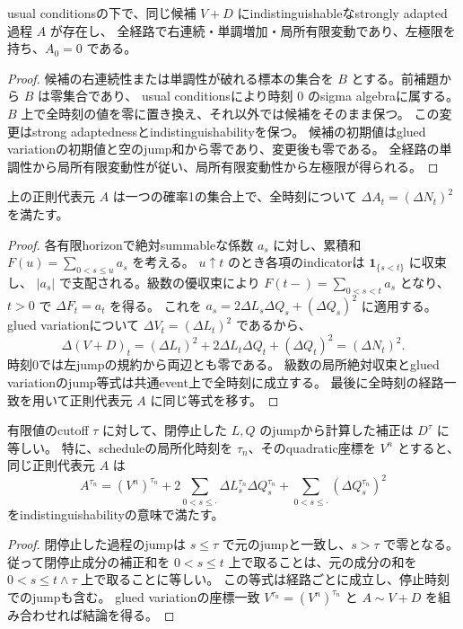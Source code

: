 \begin{lemma}[全経路で正則な代表元]
usual conditionsの下で、同じ候補 $V+D$ にindistinguishableなstrongly adapted過程 $A$ が存在し、
全経路で右連続・単調増加・局所有限変動であり、左極限を持ち、$A_0=0$ である。
\end{lemma}

\begin{proof}
候補の右連続性または単調性が破れる標本の集合を $B$ とする。前補題から $B$ は零集合であり、
usual conditionsにより時刻 $0$ のsigma algebraに属する。
$B$ 上で全時刻の値を零に置き換え、それ以外では候補をそのまま保つ。
この変更はstrong adaptednessとindistinguishabilityを保つ。
候補の初期値はglued variationの初期値と空のjump和から零であり、変更後も零である。
全経路の単調性から局所有限変動性が従い、局所有限変動性から左極限が得られる。
\end{proof}

\begin{lemma}
上の正則代表元 $A$ は一つの確率1の集合上で、全時刻について
$\Delta A_t=(\Delta N_t)^2$ を満たす。
\end{lemma}

\begin{proof}
各有限horizonで絶対summableな係数 $a_s$ に対し、累積和
$F(u)=\sum_{0<s\le u}a_s$ を考える。
$u\uparrow t$ のとき各項のindicatorは $\mathbf1_{\{s<t\}}$ に収束し、
$|a_s|$ で支配される。級数の優収束により
$F(t-)=\sum_{0<s<t}a_s$ となり、$t>0$ で $\Delta F_t=a_t$ を得る。
これを $a_s=2\Delta L_s\Delta Q_s+(\Delta Q_s)^2$ に適用する。
glued variationについて $\Delta V_t=(\Delta L_t)^2$ であるから、
\[
 \Delta(V+D)_t=(\Delta L_t)^2+2\Delta L_t\Delta Q_t+(\Delta Q_t)^2
 = (\Delta N_t)^2.
\]
時刻0では左jumpの規約から両辺とも零である。
級数の局所絶対収束とglued variationのjump等式は共通event上で全時刻に成立する。
最後に全時刻の経路一致を用いて正則代表元 $A$ に同じ等式を移す。
\end{proof}

\begin{lemma}[補正の閉停止と同じquadratic座標との一致]
有限値のcutoff $\tau$ に対して、閉停止した $L,Q$ のjumpから計算した補正は $D^\tau$ に等しい。
特に、scheduleの局所化時刻を $\tau_n$、そのquadratic座標を $V^n$ とすると、
同じ正則代表元 $A$ は
\[
 A^{\tau_n}=(V^n)^{\tau_n}
   +2\sum_{0<s\le\cdot}\Delta L^{\tau_n}_s\Delta Q^{\tau_n}_s
   +\sum_{0<s\le\cdot}(\Delta Q^{\tau_n}_s)^2
\]
をindistinguishabilityの意味で満たす。
\end{lemma}

\begin{proof}
閉停止した過程のjumpは $s\le\tau$ で元のjumpと一致し、$s>\tau$ で零となる。
従って閉停止成分の補正和を $0<s\le t$ 上で取ることは、元の成分の和を
$0<s\le t\wedge\tau$ 上で取ることに等しい。
この等式は経路ごとに成立し、停止時刻でのjumpも含む。
glued variationの座標一致 $V^{\tau_n}=(V^n)^{\tau_n}$ と
$A\sim V+D$ を組み合わせれば結論を得る。
\end{proof}

